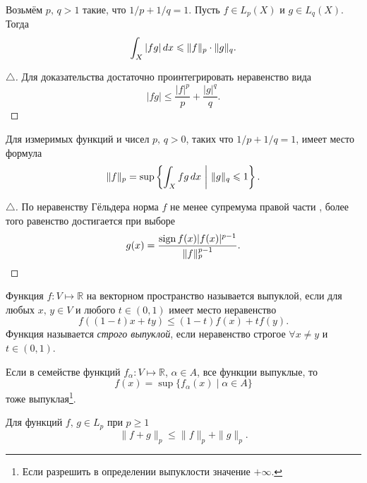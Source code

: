 \begin{to_thr}
    Возьмём $p, \, q > 1$ такие, что $1/p + 1/q = 1$. Пусть $f \in L_p (X)$ и $g \in L_q(X)$. Тогда
    \begin{equation*}
        \int_X |fg| \, d x \leqslant \|f\|_p \cdot \|g\|_q.
    \end{equation*}
\end{to_thr}

\begin{proof}[$\triangle$]
    Для доказательства достаточно проинтегрировать неравенство вида
    \begin{equation*}
        |fg| \leq \frac{|f|^p}{p} + \frac{|g|^q}{q}.
    \end{equation*}
\end{proof}

\begin{to_con}
    Для измеримых функций и чисел $p, \, q > 0$, таких что $1/p + 1/q = 1$, имеет место формула
    \begin{equation}
        \label{8_1}
        \|f\|_p = \sup \left\{
            \int_X fg \, d x \ \bigg| \  \|g\|_q \leqslant 1
        \right\}.
    \end{equation}
\end{to_con}

\begin{proof}[$\triangle$]
По неравенству Гёльдера норма $f$ не менее супремума правой части , более того равенство достигается при выборе
\begin{equation*}
    g(x) = \frac{\mathop{\mathrm{sign}}\nolimits f(x) |f(x)|^{p-1}}{\|f\|_p^{p-1}}.
\end{equation*}
\end{proof}

\begin{to_def}
    Функция $f \colon V \mapsto \mathbb{R}$ на векторном пространство называется выпуклой, если для любых $x, \, y \in V$ и любого $t \in (0, 1)$ имеет место неравенство
    \begin{equation*}
        f ( (1-t) x + ty) \leq (1-t) f(x) + t f(y).
    \end{equation*}
    Функция называется \textit{строго выпуклой}, если неравенство строгое $\forall x \neq y$ и $t \in (0, 1)$. 
\end{to_def}

\begin{to_lem}
    Если в семействе функций $f_\alpha \colon V \mapsto \mathbb{R}$, $\alpha \in A$, все функции выпуклые, то
    \begin{equation*}
        f(x) = \sup \{f_\alpha (x) \mid \alpha \in A\}
    \end{equation*}
    тоже выпуклая\footnote{
        Если разрешить в определении выпуклости значение $+ \infty$.
    }.
\end{to_lem}


\begin{to_thr}
    Для функций $f, \, g \in L_p$ при $p \geq 1$
    \begin{equation*}
        \|f + g\|_p \leq \|f\|_p + \|g\|_p.
    \end{equation*}
\end{to_thr}


